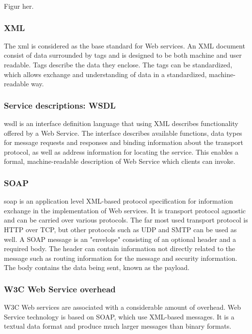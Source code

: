 Figur her.


\subsubsection{XML}

The \gls{xml} is considered as the base standard for Web services. An XML
document consist of data surrounded by tags and is designed to be both machine
and user readable. Tags describe the data they enclose. The tags can be
standardized, which allows exchange and understanding of data in a standardized,
machine-readable way.


\subsubsection{Service descriptions: WSDL}

\gls{wsdl} is an interface definition language that using XML describes
functionality offered by a Web Service. The interface describes available
functions, data types for message requests and responses and binding
information about the transport protocol, as well as address information for
locating the service. This enables a formal, machine-readable description of
Web Service which clients can invoke.


\subsubsection{SOAP}

\gls{soap} is an application level XML-based protocol specification for
information exchange in the implementation of Web services. It is transport
protocol agnostic and can be carried over various protocols. The far most used
transport protocol is HTTP over TCP, but other protocols such as UDP and SMTP
can be used as well. A SOAP message is an "envelope" consisting of an optional
header and a required body. The header can contain information not directly
related to the message such as routing information for the message and
security information. The body contains the data being sent, known as the
payload.

\subsubsection{W3C Web Service overhead}

W3C Web services are associated with a considerable amount of overhead. Web
Service technology is based on SOAP, which use XML-based messages. It is a
textual data format and produce much larger messages than binary formats.

